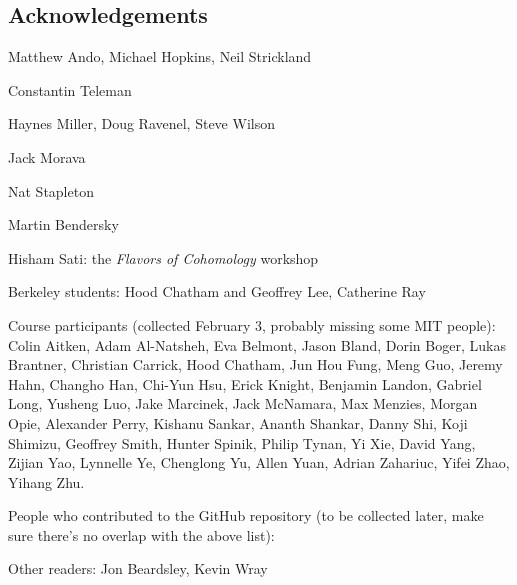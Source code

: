 


\newpage

\subsection*{Acknowledgements}

Matthew Ando, Michael Hopkins, Neil Strickland

Constantin Teleman

Haynes Miller, Doug Ravenel, Steve Wilson

Jack Morava

Nat Stapleton

Martin Bendersky



Hisham Sati: the \textit{Flavors of Cohomology} workshop

Berkeley students: Hood Chatham and Geoffrey Lee, Catherine Ray

Course participants (collected February 3, probably missing some MIT people): Colin Aitken, Adam Al-Natsheh, Eva Belmont, Jason Bland, Dorin Boger, Lukas Brantner, Christian Carrick, Hood Chatham, Jun Hou Fung, Meng Guo, Jeremy Hahn, Changho Han, Chi-Yun Hsu, Erick Knight, Benjamin Landon, Gabriel Long, Yusheng Luo, Jake Marcinek, Jack McNamara, Max Menzies, Morgan Opie, Alexander Perry, Kishanu Sankar, Ananth Shankar, Danny Shi, Koji Shimizu, Geoffrey Smith, Hunter Spinik, Philip Tynan, Yi Xie, David Yang, Zijian Yao, Lynnelle Ye, Chenglong Yu, Allen Yuan, Adrian Zahariuc, Yifei Zhao, Yihang Zhu.

People who contributed to the GitHub repository (to be collected later, make sure there's no overlap with the above list): 

Other readers: Jon Beardsley, Kevin Wray
